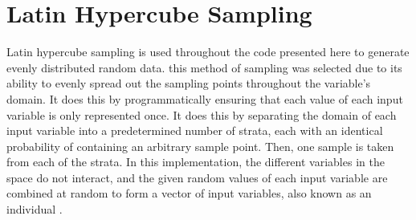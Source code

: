 \section{Latin Hypercube Sampling}
\label{sec:lhs}

Latin hypercube sampling is used throughout the code presented here to generate evenly distributed random data. this method of sampling was selected due to its ability to evenly spread out the sampling points throughout the variable's domain. It does this by programmatically ensuring that each value of each input variable is only represented once. It does this by separating the domain of each input variable into a predetermined number of strata, each with an identical probability of containing an arbitrary sample point. Then, one sample is taken from each of the strata. In this implementation, the different variables in the space do not interact, and the given random values of each input variable are combined at random to form a vector of input variables, also known as an individual \cite{lhs}.  
